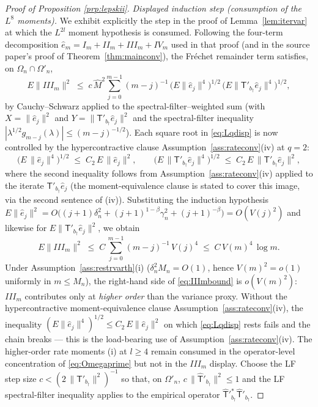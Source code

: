 \begin{proof}[Proof of Proposition \ref{prp:lepskii}]
\emph{Displayed induction step (consumption of the $L^8$ moments).}
We exhibit explicitly the step in the proof of Lemma~\ref{lem:itervar}
at which the $L^{2l}$ moment hypothesis is consumed. Following the
four-term decomposition $\hat e_m = I_m + II_m + III_m + IV_m$ used in
that proof (and in the source paper's proof of
Theorem~\ref{thm:mainconv}), the Fr\'echet remainder term satisfies, on
$\Omega_n \cap \Omega'_n$,
\begin{equation}\label{eq:Lqdisp}
E\|III_m\|^2 \;\le\; c\,\hat M^{2}\sum_{j=0}^{m-1}(m - j)^{-1}\,
\bigl(E\|\hat e_j\|^{4}\bigr)^{1/2}\,
\bigl(E\|\mathsf T'_{b_\dagger}\hat e_j\|^{4}\bigr)^{1/2},
\end{equation}
by Cauchy--Schwarz applied to the spectral-filter--weighted sum (with
$X = \|\hat e_j\|^{2}$ and $Y = \|\mathsf T'_{b_\dagger}\hat e_j\|^{2}$
and the spectral-filter inequality
$|\lambda^{1/2}g_{m-j}(\lambda)| \le (m-j)^{-1/2}$). Each square root in
\eqref{eq:Lqdisp} is now controlled by the hypercontractive clause
Assumption~\ref{ass:rateconv}\textup{(iv)} at $q = 2$:
\[
\bigl(E\,\|\hat e_j\|^{4}\bigr)^{1/2} \;\le\; C_2\,E\,\|\hat e_j\|^{2},
\qquad
\bigl(E\,\|\mathsf T'_{b_\dagger}\hat e_j\|^{4}\bigr)^{1/2} \;\le\; C_2\,
E\,\|\mathsf T'_{b_\dagger}\hat e_j\|^{2},
\]
where the second inequality follows from
Assumption~\ref{ass:rateconv}\textup{(iv)} applied to the iterate
$\mathsf T'_{b_\dagger}\hat e_j$ (the moment-equivalence clause is
stated to cover this image, via the second sentence of (iv)).
Substituting the induction hypothesis
$E\|\hat e_j\|^2 = O\bigl((j+1)\delta_n^2 + (j+1)^{1-\beta}\gamma_n^2
+ (j+1)^{-\beta}\bigr) = O(V(j)^2)$ and likewise for
$E\|\mathsf T'_{b_\dagger}\hat e_j\|^2$, we obtain
\begin{equation}\label{eq:IIImbound}
E\|III_m\|^2 \;\le\; C\,\sum_{j=0}^{m-1}(m-j)^{-1}\,V(j)^{4}
\;\le\; C\,V(m)^{4}\,\log m.
\end{equation}
Under Assumption~\ref{ass:restrvarth}\textup{(i)} ($\delta_n^2 M_n =
O(1)$, hence $V(m)^2 = o(1)$ uniformly in $m \le M_n$), the right-hand
side of \eqref{eq:IIImbound} is $o(V(m)^2)$: $III_m$ contributes only at
\emph{higher order} than the variance proxy. Without the
hypercontractive moment-equivalence clause
Assumption~\ref{ass:rateconv}\textup{(iv)}, the inequality
$(E\|\hat e_j\|^4)^{1/2} \le C_2\,E\|\hat e_j\|^2$ on which
\eqref{eq:Lqdisp} rests fails and the chain breaks --- this is the
load-bearing use of Assumption~\ref{ass:rateconv}\textup{(iv)}. The
higher-order rate moments \textup{(i)} at $l \ge 4$ remain consumed in
the operator-level concentration of \eqref{eq:Omegaprime} but not in
the $III_m$ display.
Choose the LF step size
$c < (2\,\|\mathsf T'_{b_\dagger}\|^2)^{-1}$ so that, on $\Omega'_n$,
$c\,\|\hat{\mathsf T}'_{b_\dagger}\|^2 \le 1$ and the LF spectral-filter
inequality applies to the empirical operator
$\hat{\mathsf T}'^*_{b_\dagger}\hat{\mathsf T}'_{b_\dagger}$.


\end{proof}
